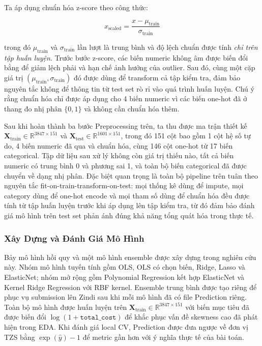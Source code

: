 Ta áp dụng chuẩn hóa z-score theo công thức:

\begin{equation}
    x_{\text{scaled}} = \frac{x - \mu_{\text{train}}}{\sigma_{\text{train}}}
\end{equation}

trong đó $\mu_{\text{train}}$ và $\sigma_{\text{train}}$ lần lượt là trung bình và độ lệch chuẩn được tính \textit{chỉ trên tập huấn luyện}. Trước bước z-score, các biến numeric không âm được biến đổi bằng  để giảm lệch phải và hạn chế ảnh hưởng của outlier. Sau đó, cùng một cặp giá trị $(\mu_{\text{train}}, \sigma_{\text{train}})$ đó được dùng để transform cả tập kiểm tra, đảm bảo nguyên tắc không để thông tin từ test set rò rỉ vào quá trình huấn luyện. Chú ý rằng chuẩn hóa chỉ được áp dụng cho 4 biến numeric vì các biến one-hot đã ở thang đo nhị phân $\{0, 1\}$ và không cần chuẩn hóa thêm.


Sau khi hoàn thành ba bước Preprocessing trên, ta thu được ma trận thiết kế $\mathbf{X}_{\text{train}} \in \mathbb{R}^{3847 \times 151}$ và $\mathbf{X}_{\text{test}} \in \mathbb{R}^{1601 \times 151}$, trong đó 151 cột bao gồm 1 cột hệ số tự do, 4 biến numeric đã qua  và chuẩn hóa, cùng 146 cột one-hot từ 17 biến categorical. Tập dữ liệu sau xử lý không còn giá trị thiếu nào, tất cả biến numeric có trung bình 0 và phương sai 1, và toàn bộ biến categorical đã được chuyển về dạng nhị phân. Đặc biệt quan trọng là toàn bộ pipeline trên tuân theo nguyên tắc fit-on-train-transform-on-test: mọi thống kê dùng để impute, mọi category dùng để one-hot encode và mọi tham số dùng để chuẩn hóa đều được tính từ tập huấn luyện trước khi áp dụng lên tập kiểm tra, từ đó đảm bảo đánh giá mô hình trên test set phản ánh đúng khả năng tổng quát hóa trong thực tế.

\subsubsection{Xây Dựng và Đánh Giá Mô Hình}

Bảy mô hình hồi quy và một mô hình ensemble được xây dựng trong nghiên cứu này. Nhóm mô hình tuyến tính gồm OLS, OLS có chọn biến, Ridge, Lasso và ElasticNet; nhóm mở rộng gồm Polynomial Regression kết hợp ElasticNet và Kernel Ridge Regression với RBF kernel. Ensemble trung bình được tạo riêng để phục vụ submission lên Zindi sau khi mỗi mô hình đã có file Prediction riêng. Toàn bộ mô hình được huấn luyện trên $\mathbf{X}_{\text{train}} \in \mathbb{R}^{3847 \times 151}$ với biến mục tiêu đã được biến đổi $\log(1 + \texttt{total\_cost})$ để khắc phục vấn đề skewness cao đã phát hiện trong EDA. Khi đánh giá local CV, Prediction được đưa ngược về đơn vị TZS bằng $\exp(\hat{y}) - 1$ để metric gần hơn với ý nghĩa thực tế của bài toán.

